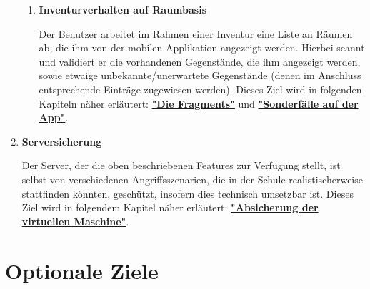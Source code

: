 \documentclass[
    headings=optiontotocandhead,%
    twoside,
    numbers=noenddot,%
    toc=flat, %
    12pt, %
    titlepage, %
    parskip=full, %
    listof=totoc, %
    listof=flat, %
    numbers=noenddot, %
    bibliography=totoc, %
    a4paper,DIV=14,
    BCOR=15mm,
]{scrbook}
\begin{document}
\begin{enumerate}
\begin{enumerate}
        \item	\textbf{Inventurverhalten auf Raumbasis}

        Der Benutzer arbeitet im Rahmen einer Inventur eine Liste an Räumen ab, die ihm von der mobilen Applikation angezeigt werden. Hierbei scannt und validiert er die vorhandenen Gegenstände, die ihm angezeigt werden, sowie etwaige unbekannte/unerwartete Gegenstände (denen im Anschluss entsprechende Einträge zugewiesen werden).
        Dieses Ziel wird in folgenden Kapiteln näher erläutert:  \textbf{\href{die-fragments}{"Die Fragments"}} und \textbf{\href{sonderfuxe4lle-auf-der-app}{"Sonderfälle auf der App"}}.
      \end{enumerate}

        \item \textbf{Serversicherung}

        Der Server, der die oben beschriebenen Features zur Verfügung stellt, ist selbst von verschiedenen Angriffsszenarien, die in der Schule realistischerweise stattfinden könnten, geschützt, insofern dies technisch umsetzbar ist. 
        Dieses Ziel wird in folgendem Kapitel näher erläutert: \textbf{\href{absicherung-der-virtuellen-maschine}{"Absicherung der virtuellen Maschine"}}.
    
\end{enumerate}



\section{Optionale Ziele}
\end{document}
